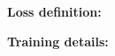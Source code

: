 \documentclass[25pt, a0paper,
               colspace=15mm, subcolspace=0mm,
               blockverticalspace=17mm]{tikzposter} %
\begin{document}
\begin{columns}
{\begin{multicols}{2}
  		\columnbreak
  		
  		\textbf{Loss definition:}
  		
  		\textbf{Training details:}
  		
  	\end{multicols}
  
  
  }
  




\end{columns}
\end{document}
